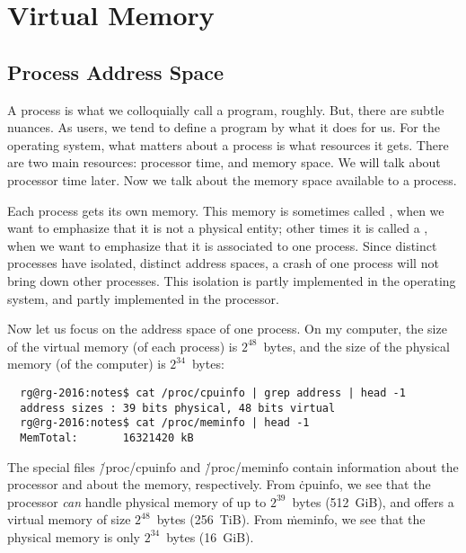 \chapter{Virtual Memory}\label{ch:01-virtual-memory}


\section{Process Address Space}


A process is what we colloquially call a program, roughly.
But, there are subtle nuances.
As users, we tend to define a program by what it does for us.
For the operating system,
  what matters about a process is what resources it gets.
There are two main resources: processor time, and memory space.
We will talk about processor time later.
Now we talk about the memory space available to a process.

Each process gets its own memory.
This memory is sometimes called ,
  when we want to emphasize that it is not a physical entity;
other times it is called a ,
  when we want to emphasize that it is associated to one process.
Since distinct processes have isolated, distinct address spaces,
  a crash of one process will not bring down other processes.
This isolation is partly implemented in the operating system,
  and partly implemented in the processor.

Now let us focus on the address space of one process.
On my computer,
  the size of the virtual memory (of each process) is $2^{48}$~bytes,
  and the size of the physical memory (of the computer) is $2^{34}$~bytes:
\begin{verbatim}
  rg@rg-2016:notes$ cat /proc/cpuinfo | grep address | head -1
  address sizes	: 39 bits physical, 48 bits virtual
  rg@rg-2016:notes$ cat /proc/meminfo | head -1
  MemTotal:       16321420 kB
\end{verbatim}
The special files \.{/proc/cpuinfo} and \.{/proc/meminfo}
  contain information about the processor and about the memory, respectively.
From \.{cpuinfo},
  we see that the processor \emph{can} handle physical memory
    of up to $2^{39}$~bytes (512~GiB),
  and offers a virtual memory of size $2^{48}$~bytes (256~TiB).
From \.{meminfo},
  we see that the physical memory is only $2^{34}$~bytes (16~GiB).

